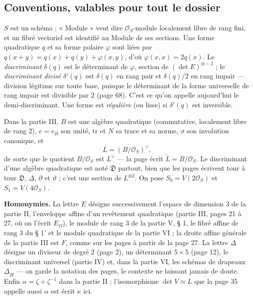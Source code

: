 \documentclass[11pt,a4paper]{article}
\begin{document}
\subsection*{Conventions, valables pour tout le dossier}

$S$ est un schéma ; « Module » veut dire $\mathcal{O}_S$-module localement libre
de rang fini, et un fibré vectoriel est identifié au Module de ses sections.
Une forme quadratique $q$ et sa forme polaire $\varphi$ sont liées par
$q(x + y) = q(x) + q(y) + \varphi(x, y)$, d'où $\varphi(x, x) = 2q(x)$. Le
\emph{discriminant} $\delta(q)$ est le déterminant de $\varphi$, section de
$(\det E)^{\otimes -2}$ ; le \emph{discriminant divisé} $\delta'(q)$ est
$\delta(q)$ en rang pair et $\delta(q)/2$ en rang impair — division légitime
sur toute base, puisque le déterminant de la forme universelle de rang impair
est divisible par $2$ (page 68). C'est ce qu'on appelle aujourd'hui le
demi-discriminant. Une forme est \emph{régulière} (ou lisse) si $\delta'(q)$
est inversible.

Dans la partie III, $B$ est une algèbre quadratique (commutative, localement
libre de rang $2$), $e = e_B$ son unité, $\mathrm{tr}$ et $N$ sa trace et sa
norme, $\sigma$ son involution canonique, et
\[
  L = (B/\mathcal{O}_S)^{\vee},
\]
de sorte que le quotient $B/\mathcal{O}_S$ est $L^{\vee}$ — la page écrit
$\check{L} = B/\mathcal{O}_S$. Le discriminant d'une algèbre quadratique est
noté $\mathfrak{D}$ partout, bien que les pages écrivent tour à tour
$\mathfrak{D}$, $\Delta$, $\partial$ et $\vartheta$ ; c'est une section de
$L^{\otimes 2}$. On pose $S_0 = V(2\mathcal{O}_S)$ et $S_1 = V(4\mathcal{O}_S)$.

\textbf{Homonymies.} La lettre $E$ désigne successivement l'espace de dimension
$3$ de la partie II, l'enveloppe affine d'un revêtement quadratique (partie
III, pages 21 à 27, où on l'écrit $E_{\Omega}$), le module de rang $3$ de la
partie V, § 1, le fibré affine de rang $3$ du § 1' et le module quadratique de
la partie VI ; la droite affine générale de la partie III est $F$, comme sur les
pages à partir de la page 27. La lettre $\Delta$ désigne un diviseur de degré
$2$ (page 2), un déterminant $5 \times 5$ (page 12), le discriminant universel
(partie IV) et, dans la partie VI, les schémas de drapeaux $\underline{\Delta}_H$
— on garde la notation des pages, le contexte ne laissant jamais de doute.
Enfin $\alpha = \zeta + \zeta^{-1}$ dans la partie II ; l'isomorphisme
$\det V \simeq L$ que la page 35 appelle aussi $\alpha$ est écrit $\kappa$ ici.
\end{document}
